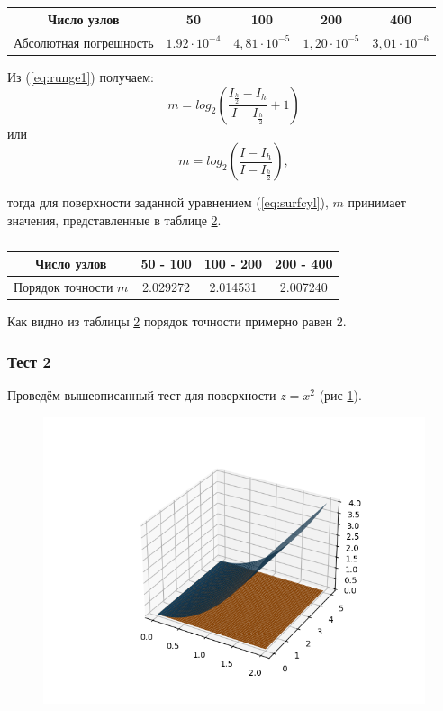 \documentclass{article}
\begin{document}
\begin{table}
\centering
\caption{\label{table:abspogcylinder}}
\begin{tabular}{|c|c|c|c|c|}
\hline
 Число узлов			& 50					& 100					& 200					& 400		\\ 
\hline
 Абсолютная погрешность & $1.92 \cdot 10^{-4}$	& $4,81 \cdot 10^{-5}$	& $1,20 \cdot 10^{-5}$	& $3,01 \cdot 10^{-6}$	\\  
\hline
\end{tabular}
\end{table}

Из (\ref{eq:runge1}) получаем:
\begin{equation}\label{eq:runge2}
m = log_2(\frac{I_{\frac{h}{2}}-I_{h}}{I-I_{\frac{h}{2}}}+1)
\end{equation}
или
\begin{equation}\label{eq:runge3}
m = log_2(\frac{I-I_{h}}{I-I_{\frac{h}{2}}}),
\end{equation}

тогда для поверхности заданной уравнением (\ref{eq:surfcyl}), $m$ принимает значения, представленные в таблице \ref{table:porTochCylinder}.

\begin{table}
\centering
\caption{\label{table:porTochCylinder}}
\begin{tabular}{|c|c|c|c|}
\hline
 Число узлов		& 50 - 100	& 100 - 200	& 200 - 400	\\ 
\hline
 Порядок точности $m$	& 2.029272	& 2.014531	& 2.007240	\\  
\hline
\end{tabular}
\end{table}

Как видно из таблицы \ref{table:porTochCylinder} порядок точности примерно равен 2.

\subsubsection*{Тест 2}

Проведём вышеописанный тест для поверхности $z = x^2$ (рис \ref{fig:squareSurf}).

\begin{figure}[H]
\centering
\includegraphics[width=0.8\linewidth]{squareSurf.png}
\caption[]{}
\label{fig:squareSurf}
\end{figure}
\end{document}

